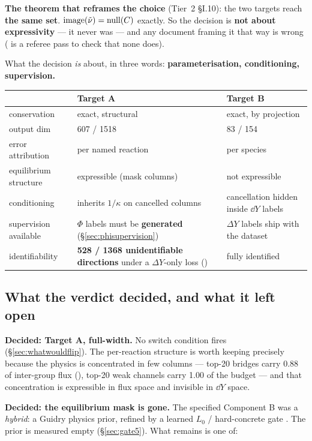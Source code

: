 \textbf{The theorem that reframes the choice} (Tier~2 \S I.10): the two targets
reach \textbf{the same set}. $\operatorname{image}(\tilde\nu) = \operatorname{null}(C)$ exactly. So
the decision is \textbf{not about expressivity} --- it never was --- and any
document framing it that way is wrong ( is a referee pass
to check that none does).

What the decision \emph{is} about, in three words: \textbf{parameterisation,
conditioning, supervision.}

\begingroup\small
\begin{tabularx}{\textwidth}{@{}L{3.0cm} Y Y@{}}
\toprule
 & \textbf{Target A} & \textbf{Target B} \\
\midrule
conservation & exact, structural & exact, by projection \\
output dim & 607 / 1518 & 83 / 154 \\
error attribution & per named reaction & per species \\
equilibrium structure & expressible (mask columns) & not expressible \\
conditioning & inherits $1/\kappa$ on cancelled columns & cancellation hidden
  inside $\dd Y$ labels \\
supervision available & $\Phi$ labels must be \textbf{generated}
  (\S\ref{sec:phisupervision}) & $\Delta Y$ labels ship with the dataset \\
identifiability & \textbf{528 / 1368 unidentifiable directions} under a
  $\Delta Y$-only loss () & fully identified \\
\bottomrule
\end{tabularx}
\endgroup

\subsection{What the verdict decided, and what it left open}
\label{sec:decided}

\textbf{Decided: Target A, full-width.} No switch condition fires
(\S\ref{sec:whatwouldflip}). The per-reaction structure is worth keeping
precisely because the physics is concentrated in few columns --- top-20 bridges
carry 0.88 of inter-group flux (), top-20 weak channels carry 1.00 of
the \Ye{} budget --- and that concentration is expressible in flux space and
invisible in $\dd Y$ space.

\textbf{Decided: the equilibrium mask is gone.} The specified Component B was a
\emph{hybrid}: a Guidry physics prior, refined by a learned $L_0$ /
hard-concrete gate \citep{louizos2018}. The prior is measured empty
(\S\ref{sec:gate5}). What remains is one of:

